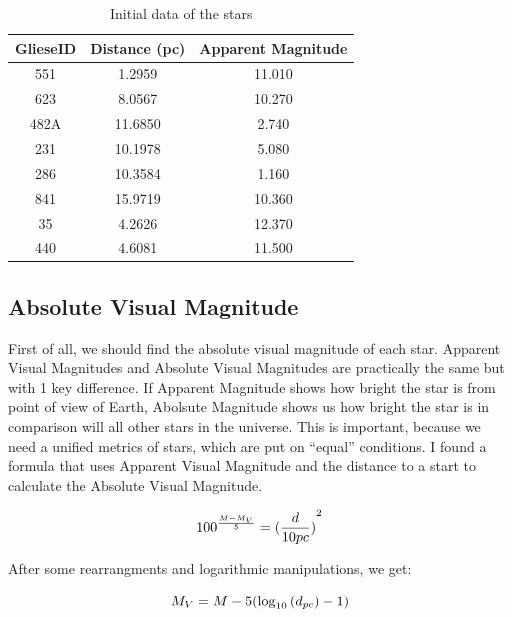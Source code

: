 \documentclass{IEEEtran}
\begin{document}
  \begin{table}[h!]
    \begin{center}
      \caption{Initial data of the stars}
      \begin{tabular}{c | c | c}
        \textbf{GlieseID} & \textbf{Distance (pc)} & \textbf{Apparent Magnitude} \\
        \hline
        551 & 1.2959 & 11.010\\
        623 & 8.0567 & 10.270\\
        482A & 11.6850 & 2.740\\
        231 & 10.1978 & 5.080\\
        286 & 10.3584 & 1.160\\
        841 & 15.9719 & 10.360\\
        35 & 4.2626 & 12.370\\
        440 & 4.6081 & 11.500\\
      \end{tabular}
      \label{data}
    \end{center}
  \end{table}
  
  \subsection{Absolute Visual Magnitude}

  First of all, we should find the absolute visual magnitude of each star. Apparent Visual Magnitudes and Absolute Visual Magnitudes are practically the same but with 1 key difference. If Apparent Magnitude shows how bright the star is from point of view of Earth, Abolsute Magnitude shows us how bright the star is in comparison will all other stars in the universe. This is important, because we need a unified metrics of stars, which are put on ``equal'' conditions. I found a formula that uses Apparent Visual Magnitude and the distance to a start to calculate the Absolute Visual Magnitude. 
  
  \begin{equation}
    {100}^{\frac{M-M_V}{5}} = {(\frac{d}{10pc})}^2\\
  \end{equation}

  After some rearrangments and logarithmic manipulations, we get:

  \begin{equation}
    M_V = M - 5(\log_{10}{(d_{pc})}-1)\\
    \end{equation}
    
\end{document}
